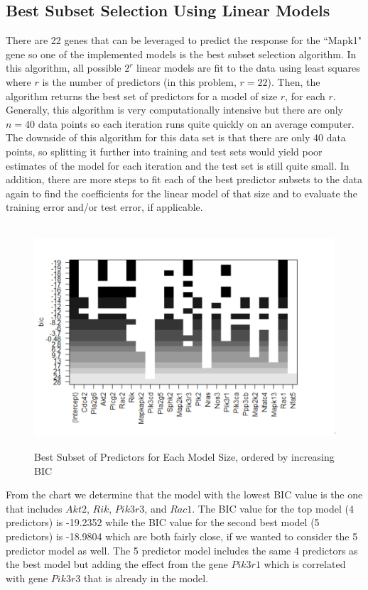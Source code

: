 \documentclass{article}
\begin{document}
\subsection{Best Subset Selection Using Linear Models}
There are 22 genes that can be leveraged to predict the response for the ``Mapk1" gene so one of the implemented models is the best subset selection algorithm.  In this algorithm, all possible $2^r$ linear models are fit to the data using least squares where $r$ is the number of predictors (in this problem, $r=22$).  Then, the algorithm returns the best set of predictors for a model of size $r$, for each $r$.  Generally, this algorithm is very computationally intensive but there are only $n=40$ data points so each iteration runs quite quickly on an average computer.  The downside of this algorithm for this data set is that there are only 40 data points, so splitting it further into training and test sets would yield poor estimates of the model for each iteration and the test set is still quite small.  In addition, there are more steps to fit each of the best predictor subsets to the data again to find the coefficients for the linear model of that size and to evaluate the training error and/or test error, if applicable.\\
\null\\
\begin{figure}[H]
	\caption{Best Subset of Predictors for Each Model Size, ordered by increasing BIC}
	\includegraphics[scale=0.60]{best_subsets}
	\centering
	\label{fig:best_subsets}
\end{figure}
From the chart we determine that the model with the lowest BIC value is the one that includes $Akt2$, $Rik$, $Pik3r3$, and $Rac1$.  The BIC value for the top model (4 predictors) is  -19.2352 while the BIC value for the second best model (5 predictors) is -18.9804 which are both fairly close, if we wanted to consider the 5 predictor model as well.  The 5 predictor model includes the same 4 predictors as the best model but adding the effect from the gene $Pik3r1$ which is correlated with gene $Pik3r3$ that is already in the model.
%
\end{document}
